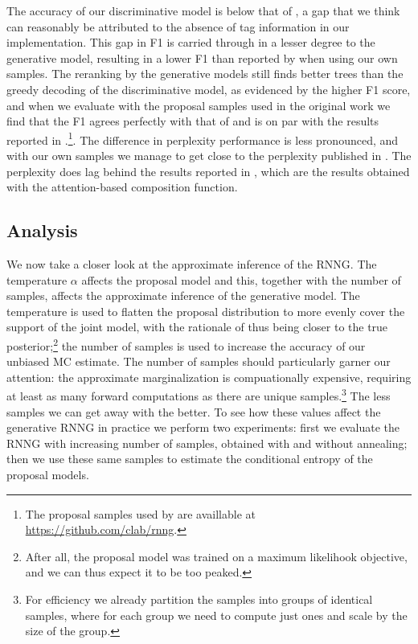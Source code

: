     The accuracy of our discriminative model is below that of \citet{dyer2016rnng}, a gap that we think can reasonably be attributed to the absence of tag information in our implementation. This gap in F1 is carried through in a lesser degree to the generative model, resulting in a lower F1 than reported by \citet{dyer2016rnng} when using our own samples. The reranking by the generative models still finds better trees than the greedy decoding of the discriminative model, as evidenced by the higher F1 score, and when we evaluate with the proposal samples used in the original work we find that the F1 agrees perfectly with that of \citet{dyer2016rnng} and is on par with the results reported in \citet{kuncoro2017syntax}.\footnote{The proposal samples used by \citet{dyer2016rnng} are availlable at \url{https://github.com/clab/rnng}.}. The difference in perplexity performance is less pronounced, and with our own samples we manage to get close to the perplexity published in \citet{dyer2016rnng}. The perplexity does lag behind the results reported in \citet{kuncoro2017syntax}, which are the results obtained with the attention-based composition function.

  \subsection{Analysis}
    We now take a closer look at the approximate inference of the RNNG. The temperature $\alpha$ affects the proposal model and this, together with the number of samples, affects the approximate inference of the generative model. The temperature is used to flatten the proposal distribution to more evenly cover the support of the joint model, with the rationale of thus being closer to the true posterior;\footnote{After all, the proposal model was trained on a maximum likelihook objective, and we can thus expect it to be too peaked.} the number of samples is used to increase the accuracy of our unbiased MC estimate. The number of samples should particularly garner our attention: the approximate marginalization is compuationally expensive, requiring at least as many forward computations as there are unique samples.\footnote{For efficiency we already partition the samples into groups of identical samples, where for each group we need to compute just ones and scale by the size of the group.} The less samples we can get away with the better. To see how these values affect the generative RNNG in practice we perform two experiments: first we evaluate the RNNG with increasing number of samples, obtained with and without annealing; then we use these same samples to estimate the conditional entropy of the proposal models.

